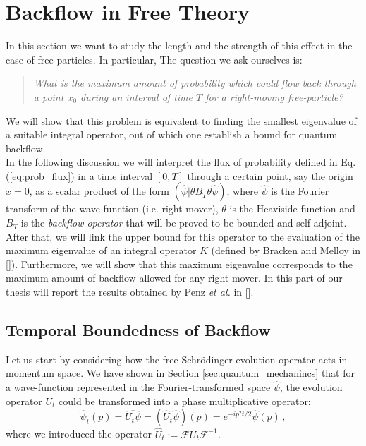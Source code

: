 \section{Backflow in Free Theory}
In this section we want to study the length and the strength of this effect in the case of free particles. In particular, The question we ask ourselves is:
\begin{verse}
	\centering
\emph{What is the maximum amount of probability which could flow back through a point $x_0$ during an interval of time $T$ for a right-moving free-particle?}
\end{verse}
We will show that this problem is equivalent to finding the smallest eigenvalue of a suitable integral operator, out of which one establish a bound for quantum backflow.\\
In the following discussion we will interpret the flux of probability defined in Eq. (\ref{eq:prob_flux}) in a time interval $[0,T]$ through a certain point, say the origin $x=0$, as a scalar product of the form $(\hat{\psi}|\theta B_T \theta \hat{\psi})$, where $\hat{\psi}$ is the Fourier transform of the wave-function (i.e. right-mover), $\theta$ is the Heaviside function and $B_T$ is the \textit{backflow operator} that will be proved to be bounded and self-adjoint. After that, we will link the upper bound for this operator to the evaluation of the maximum eigenvalue of an integral operator $K$ (defined by Bracken and Melloy in [\citealp{bracken}]). Furthermore, we will show that this maximum eigenvalue corresponds to the maximum amount of backflow allowed for any right-mover. In this part of our thesis will report the results obtained by Penz \textit{et al.} in [\citealp{penz}].\\
\subsection{Temporal Boundedness of Backflow}
Let us start by considering how the free Schr\"{o}dinger evolution operator acts in momentum space. We have shown in Section \ref{sec:quantum_mechanincs} that for a wave-function represented in the Fourier-transformed space $\hat{\psi}$, the evolution operator $U_t$ could be transformed into a phase multiplicative operator:
 \begin{equation}
 	\hat{\psi}_t(p)=\widehat{U_t\psi}=(\widehat{U}_t\hat{\psi})(p)=e^{-ip^2t/2}\hat{\psi}(p)\, ,
 	\label{eq:unitary_evolution}
 \end{equation}
 where we introduced the operator $\widehat{U}_t:=\mathcal{F}U_t\mathcal{F}^{-1}$.
 

